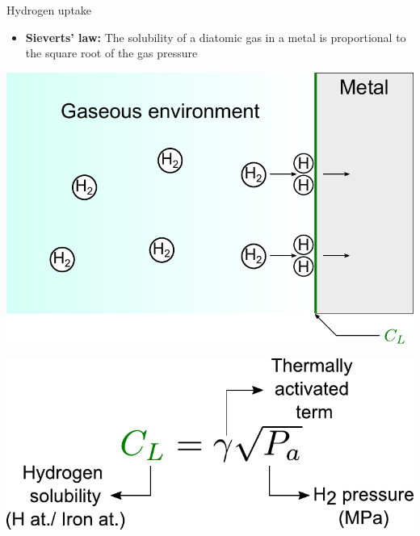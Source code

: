 \documentclass[9pt]{beamer}
\begin{document}

\begin{frame}{Hydrogen uptake}

\begin{itemize}
	\item \textbf{Sieverts' law:} The solubility of a diatomic gas in a metal is proportional to the square root of the gas pressure
\end{itemize}

\vspace{1cm}

    \begin{minipage}{0.55\textwidth}
        \centering
        \includegraphics[width=\textwidth]{Images/H2_uptake.pdf}
    \end{minipage}
    \hfill
    \begin{minipage}{0.42\textwidth}
        \centering
        \includegraphics[width=\textwidth]{Images/sieverts.pdf}
    \end{minipage}

\end{frame}
\end{document}
